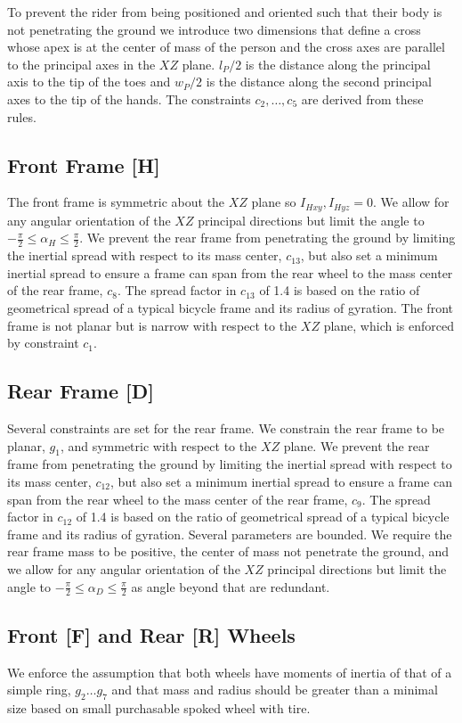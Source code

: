 \documentclass{bmd2019a}
\begin{document}
To prevent the rider from being positioned and oriented such that their body is
not penetrating the ground we introduce two dimensions that define a cross
whose apex is at the center of mass of the person and the cross axes are
parallel to the principal axes in the $XZ$ plane. $l_P / 2$ is the distance
along the principal axis to the tip of the toes and $w_P / 2$ is the distance
along the second principal axes to the tip of the hands. The constraints
$c_2,\ldots,c_5$ are derived from these rules.

\subsection{Front Frame [H]}
%
The front frame is symmetric about the $XZ$ plane so $I_{Hxy}, I_{Hyz} = 0$. We
allow for any angular orientation of the $XZ$ principal directions but limit
the angle to $-\frac{\pi}{2} \leq \alpha_H \leq \frac{\pi}{2}$. We prevent the
rear frame from penetrating the ground by limiting the inertial spread with
respect to its mass center, $c_{13}$, but also set a minimum inertial spread to
ensure a frame can span from the rear wheel to the mass center of the rear
frame, $c_8$. The spread factor in $c_{13}$ of 1.4 is based on the ratio of
geometrical spread of a typical bicycle frame and its radius of gyration. The
front frame is not planar but is narrow with respect to the $XZ$ plane, which
is enforced by constraint $c_1$.

\subsection{Rear Frame [D]}
%
Several constraints are set for the rear frame. We constrain the rear frame to
be planar, $g_1$, and symmetric with respect to the $XZ$ plane. We prevent the
rear frame from penetrating the ground by limiting the inertial spread with
respect to its mass center, $c_{12}$, but also set a minimum inertial spread to
ensure a frame can span from the rear wheel to the mass center of the rear
frame, $c_9$. The spread factor in $c_{12}$ of 1.4 is based on the ratio of
geometrical spread of a typical bicycle frame and its radius of gyration.
Several parameters are bounded. We require the rear frame mass to be positive,
the center of mass not penetrate the ground, and we allow for any angular
orientation of the $XZ$ principal directions but limit the angle to
$-\frac{\pi}{2} \leq \alpha_D \leq \frac{\pi}{2}$ as angle beyond that are
redundant.

\subsection{Front [F] and Rear [R] Wheels}
%
We enforce the assumption that both wheels have moments of inertia of that of a
simple ring, $g_2 \ldots g_7$ and that mass and radius should be greater than a
minimal size based on small purchasable spoked wheel with tire.
\end{document}
